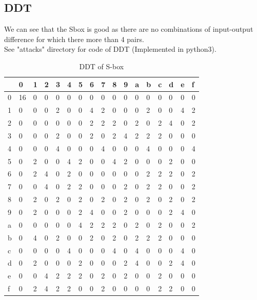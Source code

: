 \documentclass[final]{transcrypto}
\begin{document}
\subsection{DDT}
We can see that the Sbox is good as there are no combinations of input-output difference for which there more than 4 pairs.\\
See "attacks" directory for code of DDT (Implemented in python3).
\begin{table}[H]
	\centering
	\caption{DDT of S-box}
	\begin{tabular}{|l||l|l|l|l|l|l|l|l|l|l|l|l|l|l|l|l|}
		\hline
 &  0&	1&	2&	3&	4&	5&	6&	7&	8&	9&	a&	b&	c&	d&	e&	f\\ \hline
 \hline
0& 16 & 0 & 0 & 0 & 0 & 0 & 0 & 0 & 0 & 0 & 0 & 0 & 0 & 0 & 0 & 0 \\ \hline
1& 0 & 0 & 0 & 2 & 0 & 0 & 4 & 2 & 0 & 0 & 0 & 2 & 0 & 0 & 4 & 2 \\ \hline
2& 0 & 0 & 0 & 0 & 0 & 0 & 2 & 2 & 2 & 0 & 2 & 0 & 2 & 4 & 0 & 2 \\ \hline
3& 0 & 0 & 0 & 2 & 0 & 0 & 2 & 0 & 2 & 4 & 2 & 2 & 2 & 0 & 0 & 0  \\ \hline 
4& 0 & 0 & 0 & 4 & 0 & 0 & 0 & 4 & 0 & 0 & 0 & 4 & 0 & 0 & 0 & 4  \\ \hline
5& 0 & 2 & 0 & 0 & 4 & 2 & 0 & 0 & 4 & 2 & 0 & 0 & 0 & 2 & 0 & 0  \\ \hline
6& 0 & 2 & 4 & 0 & 2 & 0 & 0 & 0 & 0 & 0 & 0 & 2 & 2 & 2 & 0 & 2  \\ \hline
7& 0 & 0 & 4 & 0 & 2 & 2 & 0 & 0 & 0 & 2 & 0 & 2 & 2 & 0 & 0 & 2  \\ \hline
8& 0 & 2 & 0 & 2 & 0 & 2 & 0 & 2 & 0 & 2 & 0 & 2 & 0 & 2 & 0 & 2  \\ \hline
9& 0 & 2 & 0 & 0 & 0 & 2 & 4 & 0 & 0 & 2 & 0 & 0 & 0 & 2 & 4 & 0  \\ \hline
a& 0 & 0 & 0 & 0 & 0 & 4 & 2 & 2 & 2 & 0 & 2 & 0 & 2 & 0 & 0 & 2  \\ \hline
b& 0 & 4 & 0 & 2 & 0 & 0 & 2 & 0 & 2 & 0 & 2 & 2 & 2 & 0 & 0 & 0  \\ \hline
c& 0 & 0 & 0 & 0 & 4 & 0 & 0 & 0 & 4 & 0 & 4 & 0 & 0 & 0 & 4 & 0  \\ \hline
d& 0 & 2 & 0 & 0 & 0 & 2 & 0 & 0 & 0 & 2 & 4 & 0 & 0 & 2 & 4 & 0  \\ \hline
e& 0 & 0 & 4 & 2 & 2 & 2 & 0 & 2 & 0 & 2 & 0 & 0 & 2 & 0 & 0 & 0  \\ \hline
f& 0 & 2 & 4 & 2 & 2 & 0 & 0 & 2 & 0 & 0 & 0 & 0 & 2 & 2 & 0 & 0 \\ \hline
	\end{tabular}
\end{table}
\end{document}
